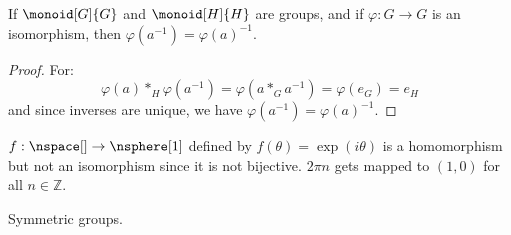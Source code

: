         \begin{theorem}
            If $\monoid[G]{G}$ and $\monoid[H]{H}$ are groups, and if
            $\varphi:G\rightarrow{G}$ is an isomorphism, then
            $\varphi(a^{\minus{1}})=\varphi(a)^{\minus{1}}$.
        \end{theorem}
        \begin{proof}
            For:
            \begin{equation}
                \varphi(a)*_{H}\varphi(a^{\minus{1}})
                    =\varphi(a*_{G}a^{\minus{1}})
                    =\varphi(e_{G})
                    =e_{H}
            \end{equation}
            and since inverses are unique, we have
            $\varphi(a^{\minus{1}})=\varphi(a)^{\minus{1}}$.
        \end{proof}
        \begin{example}
            $f:\nspace[]\rightarrow\nsphere[1]$ defined by
            $f(\theta)=\exp(i\theta)$ is a homomorphism but not an
            isomorphism since it is not bijective. $2\pi{n}$ gets mapped to
            $(1,0)$ for all $n\in\mathbb{Z}$.
        \end{example}
        Symmetric groups.
